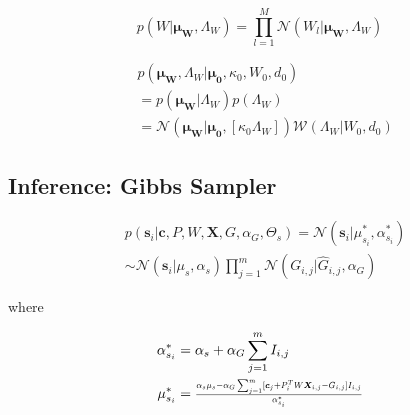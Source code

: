 \documentclass[10pt]{proc}
\begin{document}
\begin{equation}
    p(W | \bm{\mu_W}, \Lambda_W) =
        \prod_{l=1}^M \mathcal{N}(W_l | \bm{\mu_W}, \Lambda_W)
\end{equation}

\begin{equation}
\begin{aligned}
    &p(\bm{\mu_W}, \Lambda_W | \bm{\mu_0}, \kappa_0, W_0, d_0) \\
        & = p(\bm{\mu_W} | \Lambda_W) p(\Lambda_W) \\
        & = \mathcal{N}(\bm{\mu_W} | \bm{\mu_0}, [\kappa_0 \Lambda_W])
            \mathcal{W}(\Lambda_W | W_0, d_0)
\end{aligned}
\end{equation}


\subsection{Inference: Gibbs Sampler}

\begin{mdframed}[style=eqbox]
\begin{equation} \label{eqn:cpd-s}
\begin{aligned}
    &p(\bm{s}_i | \bm{c}, P, W, \bm{X}, G, \alpha_G, \Theta_s)
        = \mathcal{N}(\bm{s}_i | \mu_{s_i}^*, \alpha_{s_i}^*) \\
        & \sim \mathcal{N}(\bm{s}_i | \mu_s, \alpha_s)
               \prod_{j=1}^m \mathcal{N}(G_{i,j} | \hat{G}_{i,j}, \alpha_G)
\end{aligned}
\end{equation}

where

\begin{align}
    \alpha_{s_i}^* &= \begin{aligned}[t]
        \alpha_s + \alpha_G \sum_{j=1}^m I_{i,j}
    \end{aligned}\\
%
    \mu_{s_i}^* &= \begin{aligned}[t]
        \hstretch{0.8}{\vstretch{0.9}{
            \frac{\alpha_s\mu_s -
                  \alpha_G \sum_{j=1}^m
                      [\bm{c}_j + P_i^TW\bm{X}_{i,j} - G_{i,j} ] I_{i,j}}
                 {\alpha_{s_i}^*}}}
    \end{aligned}
\end{align}
\end{mdframed}
\end{document}
